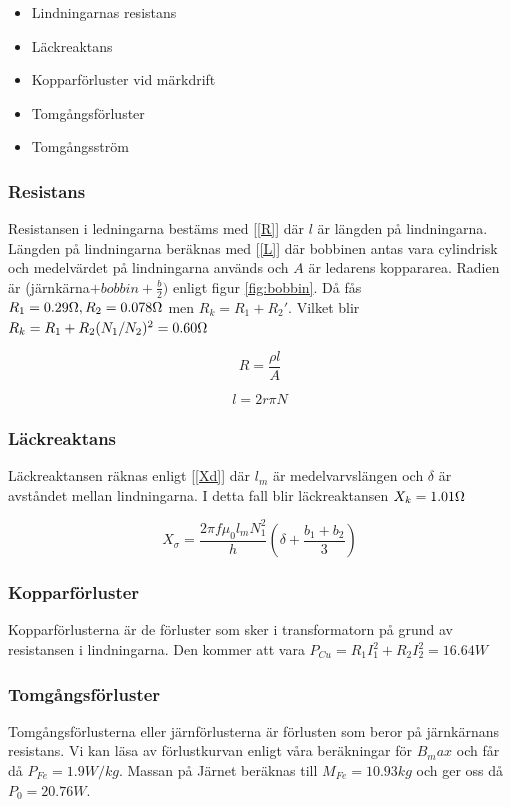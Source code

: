 \documentclass{article}
\begin{document}
\begin{itemize}
  \item Lindningarnas resistans
  \item Läckreaktans
  \item Kopparförluster vid märkdrift
  \item Tomgångsförluster
  \item Tomgångsström
\end{itemize}

\subsubsection{Resistans}
Resistansen i ledningarna bestäms med [\ref{R}] där $l$ är längden på lindningarna.
Längden på lindningarna beräknas med [\ref{L}] där bobbinen antas vara cylindrisk och medelvärdet på lindningarna används och $A$ är ledarens koppararea.
Radien är (järnkärna$+bobbin+\frac{b}{2})$ enligt figur \ref{fig:bobbin}.
Då fås $R_1=0.29 \ohm,R_2=0.078 \ohm$ men $R_k=R_1+R_2'$.
Vilket blir $R_k=R_1+R_2 (N_1/N_2)^2=0.60 \ohm$

\begin{equation}
  R=\frac{\rho l}{A}
  \label{R}
\end{equation}

\begin{equation}
  l=2 r \pi N
  \label{L}
\end{equation}

\subsubsection{Läckreaktans}
Läckreaktansen räknas enligt [\ref{Xd}] där $l_m$ är medelvarvslängen och $\delta$ är avståndet mellan lindningarna.
I detta fall blir läckreaktansen $X_k=1.01 \ohm $

\begin{equation}
  X_\sigma = \frac{2 \pi f \mu_0 l_m N_1^2}{h} (\delta + \frac{b_1 + b_2}{3})
  \label{Xd}
\end{equation}

\subsubsection{Kopparförluster}
Kopparförlusterna är de förluster som sker i transformatorn på grund av resistansen i lindningarna.
Den kommer att vara $P_{Cu}=R_1 I_1^2 +R_2I_2^2=16.64 W$

\subsubsection{Tomgångsförluster}
Tomgångsförlusterna eller järnförlusterna är förlusten som beror på järnkärnans resistans.
Vi kan läsa av förlustkurvan enligt våra beräkningar för $B_max$ och får då $P_{Fe}=1.9 W/kg$.
Massan på Järnet beräknas till $M_{Fe}= 10.93 kg$ och ger oss då $P_0=20.76 W$.
\end{document}

